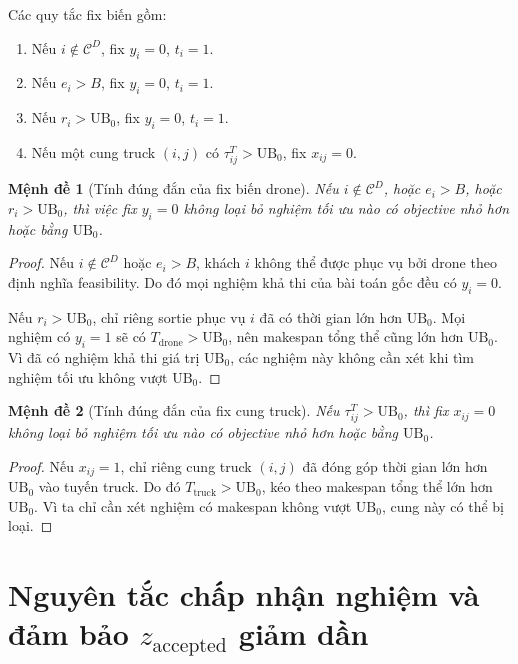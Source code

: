 \documentclass[12pt,a4paper]{article}
\newtheorem{proposition}{Mệnh đề}
\newcommand{\CD}{\mathcal{C}^{D}}
\newcommand{\UB}{\mathrm{UB}}
\begin{document}
Các quy tắc fix biến gồm:
\begin{enumerate}[leftmargin=2em]
    \item Nếu $i\notin \CD$, fix $y_i=0$, $t_i=1$.
    \item Nếu $e_i>B$, fix $y_i=0$, $t_i=1$.
    \item Nếu $r_i>\UB_0$, fix $y_i=0$, $t_i=1$.
    \item Nếu một cung truck $(i,j)$ có $\tau^T_{ij}>\UB_0$, fix $x_{ij}=0$.
\end{enumerate}

\begin{proposition}[Tính đúng đắn của fix biến drone]
Nếu $i\notin \CD$, hoặc $e_i>B$, hoặc $r_i>\UB_0$, thì việc fix $y_i=0$ không loại bỏ nghiệm tối ưu nào có objective nhỏ hơn hoặc bằng $\UB_0$.
\end{proposition}
\begin{proof}
Nếu $i\notin \CD$ hoặc $e_i>B$, khách $i$ không thể được phục vụ bởi drone theo định nghĩa feasibility. Do đó mọi nghiệm khả thi của bài toán gốc đều có $y_i=0$.

Nếu $r_i>\UB_0$, chỉ riêng sortie phục vụ $i$ đã có thời gian lớn hơn $\UB_0$. Mọi nghiệm có $y_i=1$ sẽ có $T_{\mathrm{drone}}>\UB_0$, nên makespan tổng thể cũng lớn hơn $\UB_0$. Vì đã có nghiệm khả thi giá trị $\UB_0$, các nghiệm này không cần xét khi tìm nghiệm tối ưu không vượt $\UB_0$.
\end{proof}

\begin{proposition}[Tính đúng đắn của fix cung truck]
Nếu $\tau^T_{ij}>\UB_0$, thì fix $x_{ij}=0$ không loại bỏ nghiệm tối ưu nào có objective nhỏ hơn hoặc bằng $\UB_0$.
\end{proposition}
\begin{proof}
Nếu $x_{ij}=1$, chỉ riêng cung truck $(i,j)$ đã đóng góp thời gian lớn hơn $\UB_0$ vào tuyến truck. Do đó $T_{\mathrm{truck}}>\UB_0$, kéo theo makespan tổng thể lớn hơn $\UB_0$. Vì ta chỉ cần xét nghiệm có makespan không vượt $\UB_0$, cung này có thể bị loại.
\end{proof}

\section{Nguyên tắc chấp nhận nghiệm và đảm bảo $z_{\mathrm{accepted}}$ giảm dần}
\label{sec:accepted}
\end{document}
